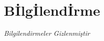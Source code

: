 \documentclass[conference, a4paper]{IEEEtran}
\begin{document}


\section*{B{\footnotesize İ}lg{\footnotesize İ}lend{\footnotesize İ}rme}

 \textit{Bilgilendirmeler Gizlenmiştir}


%
%
%
\end{document}
